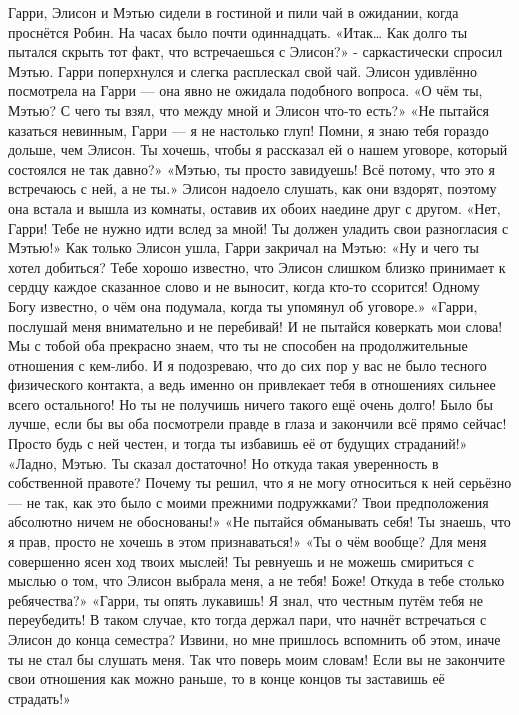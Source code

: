 \documentclass[a4paper,12pt]{book}
\begin{document}
	Гарри, Элисон и Мэтью сидели в гостиной и пили чай в ожидании, когда проснётся Робин. На часах было почти одиннадцать.
	«Итак… Как долго ты пытался скрыть тот факт, что встречаешься с Элисон?» - саркастически спросил Мэтью.
	Гарри поперхнулся и слегка расплескал свой чай. Элисон удивлённо посмотрела на Гарри — она явно не ожидала подобного вопроса.
	«О чём ты, Мэтью? С чего ты взял, что между мной и Элисон что-то есть?»
	«Не пытайся казаться невинным, Гарри — я не настолько глуп! Помни, я знаю тебя гораздо дольше, чем Элисон. Ты хочешь, чтобы я рассказал ей о нашем уговоре, который состоялся не так давно?»
	«Мэтью, ты просто завидуешь! Всё потому, что это я встречаюсь с ней, а не ты.»
	Элисон надоело слушать, как они вздорят, поэтому она встала и вышла из комнаты, оставив их обоих наедине друг с другом.
	«Нет, Гарри! Тебе не нужно идти вслед за мной! Ты должен уладить свои разногласия с Мэтью!»
	Как только Элисон ушла, Гарри закричал на Мэтью:
	«Ну и чего ты хотел добиться? Тебе хорошо известно, что Элисон слишком близко принимает к сердцу каждое сказанное слово и не выносит, когда кто-то ссорится! Одному Богу известно, о чём она подумала, когда ты упомянул об уговоре.»
	«Гарри, послушай меня внимательно и не перебивай! И не пытайся коверкать мои слова! Мы с тобой оба прекрасно знаем, что ты не способен на продолжительные отношения с кем-либо. И я подозреваю, что до сих пор у вас не было тесного физического контакта, а ведь именно он привлекает тебя в отношениях сильнее всего остального! Но ты не получишь ничего такого ещё очень долго! Было бы лучше, если бы вы оба посмотрели правде в глаза и закончили всё прямо сейчас! Просто будь с ней честен, и тогда ты избавишь её от будущих страданий!»
	«Ладно, Мэтью. Ты сказал достаточно! Но откуда такая уверенность в собственной правоте? Почему ты решил, что я не могу относиться к ней серьёзно — не так, как это было с моими прежними подружками? Твои предположения абсолютно ничем не обоснованы!»
	«Не пытайся обманывать себя! Ты знаешь, что я прав, просто не хочешь в этом признаваться!»
	«Ты о чём вообще? Для меня совершенно ясен ход твоих мыслей! Ты ревнуешь и не можешь смириться с мыслью о том, что Элисон выбрала меня, а не тебя! Боже! Откуда в тебе столько ребячества?»
	«Гарри, ты опять лукавишь! Я знал, что честным путём тебя не переубедить! В таком случае, кто тогда держал пари, что начнёт встречаться с Элисон до конца семестра? Извини, но мне пришлось вспомнить об этом, иначе ты не стал бы слушать меня. Так что поверь моим словам! Если вы не закончите свои отношения как можно раньше, то в конце концов ты заставишь её страдать!»
\end{document}
